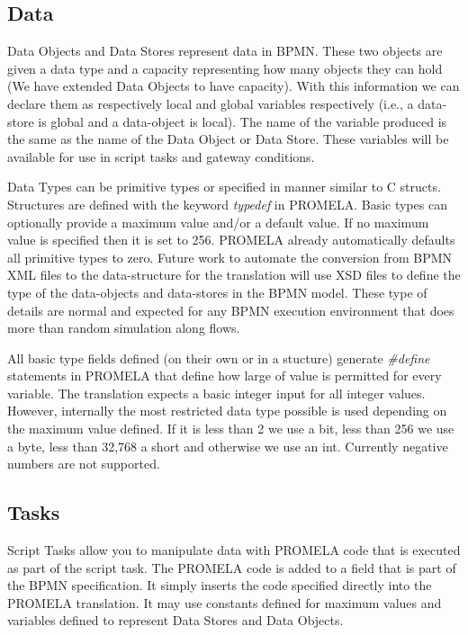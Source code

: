 \documentclass[11pt,twocolumn]{article}
\begin{document}
\subsection{Data}\label{sec:data}

Data Objects and Data Stores represent data in BPMN. These two objects are given a data type and a capacity representing how many objects they can hold (We have extended Data Objects to have capacity). With this information we can declare them as respectively local and global variables respectively (i.e., a data-store is global and a data-object is local). The name of the variable produced is the same as the name of the Data Object or Data Store. These variables will be available for use in script tasks and gateway conditions.

Data Types can be primitive types or specified in manner similar to C structs. Structures are defined with the keyword \emph{typedef} in PROMELA. Basic types can optionally provide a maximum value and/or a default value. If no maximum value is specified then it is set to 256.  PROMELA already automatically defaults all primitive types to zero. Future work to automate the conversion from BPMN XML files to the data-structure for the translation will use XSD files to define the type of the data-objects and data-stores in the BPMN model. These type of details are normal and expected for any BPMN execution environment that does more than random simulation along flows.

All basic type fields defined (on their own or in a stucture)  generate \emph{\#define} statements in PROMELA that define how large of value is permitted for every variable. The translation expects a basic integer input for all integer values. However, internally the most restricted data type possible is used depending on the maximum value defined. If it is less than 2 we use a bit, less than 256 we use a byte, less than 32,768 a short and otherwise we use an int. Currently negative numbers are not supported.



\subsection{Tasks}

Script Tasks allow you to manipulate data with PROMELA code that is executed as part of the script task. The PROMELA code is added to a field that is part of the BPMN specification. It simply inserts the code specified directly into the PROMELA translation. It may use constants defined for maximum values and variables defined to represent Data Stores and Data Objects. 
\end{document}
